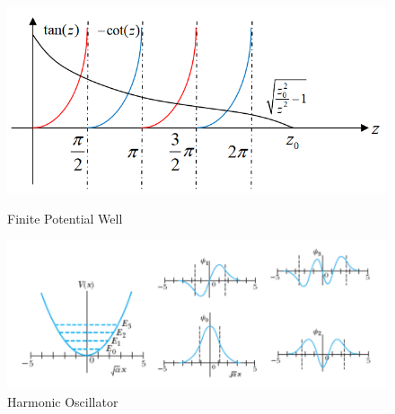\documentclass[a4paper,10pt]{article}
\begin{document}
\begin{figure}[H]
    \centering
    \begin{minipage}[t]{0.5\linewidth}
        \centering
        \includegraphics[width=0.95\linewidth]{finite-potential-solution.png}
        \caption{Finite Potential Well}
    \end{minipage}%
    \begin{minipage}[t]{0.5\linewidth}
        \centering
        \includegraphics[width=0.95\linewidth]{harmonic-oscillator-solution.png}
        \caption{Harmonic Oscillator}
    \end{minipage}
\end{figure}
\end{document}
